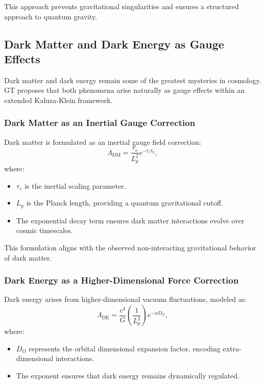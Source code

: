 \documentclass{article}
\theoremstyle{plain}
\begin{document}
This approach prevents gravitational singularities and ensures a structured approach to quantum gravity.

\subsection{Dark Matter and Dark Energy as Gauge Effects}
Dark matter and dark energy remain some of the greatest mysteries in cosmology. GT proposes that both phenomena arise naturally as gauge effects within an extended Kaluza-Klein framework.

\subsubsection{Dark Matter as an Inertial Gauge Correction}
Dark matter is formulated as an inertial gauge field correction:
\begin{equation}
\Lambda_{\text{DM}} = \frac{\tau_v}{L_p^2} e^{-t/t_0},
\end{equation}
where:
\begin{itemize}
\item $\tau_v$ is the inertial scaling parameter.
\item $L_p$ is the Planck length, providing a quantum gravitational cutoff.
\item The exponential decay term ensures dark matter interactions evolve over cosmic timescales.
\end{itemize}

This formulation aligns with the observed non-interacting gravitational behavior of dark matter.

\subsubsection{Dark Energy as a Higher-Dimensional Force Correction}
Dark energy arises from higher-dimensional vacuum fluctuations, modeled as:
\begin{equation}
\Lambda_{\text{DE}} = \frac{c^4}{G} \left( \frac{1}{L_p^2} \right) e^{-\alpha D_O},
\end{equation}
where:
\begin{itemize}
\item $D_O$ represents the orbital dimensional expansion factor, encoding extra-dimensional interactions.
\item The exponent ensures that dark energy remains dynamically regulated.
\end{itemize}
\end{document}
